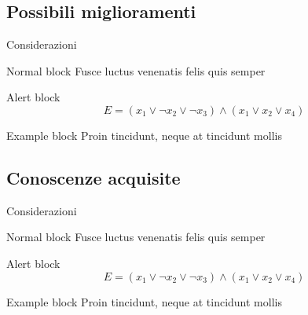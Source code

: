 \documentclass{beamer}
\begin{document}
	\subsection{Possibili miglioramenti}

	\begin{frame}{Considerazioni}
		\begin{block}{Normal block}
			Fusce luctus venenatis felis quis semper
		\end{block}

		\begin{alertblock}{Alert block}
			$$ E = (x_1 \vee \neg x_2 \vee \neg x_3) \wedge (x_1 \vee x_2 \vee x_4) $$
		\end{alertblock}

		\begin{exampleblock}{Example block}
			Proin tincidunt, neque at tincidunt mollis
		\end{exampleblock}
	\end{frame}
	
	\subsection{Conoscenze acquisite}

	\begin{frame}{Considerazioni}
		\begin{block}{Normal block}
			Fusce luctus venenatis felis quis semper
		\end{block}

		\begin{alertblock}{Alert block}
			$$ E = (x_1 \vee \neg x_2 \vee \neg x_3) \wedge (x_1 \vee x_2 \vee x_4) $$
		\end{alertblock}

		\begin{exampleblock}{Example block}
			Proin tincidunt, neque at tincidunt mollis
		\end{exampleblock}
	\end{frame}
\end{document}

